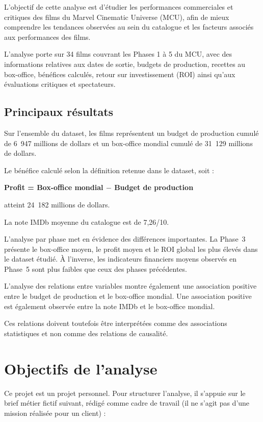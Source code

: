 \documentclass[a4paper,11pt]{article}
\begin{document}
L'objectif de cette analyse est d'étudier les performances commerciales et
critiques des films du Marvel Cinematic Universe (MCU), afin de mieux
comprendre les tendances observées au sein du catalogue et les facteurs
associés aux performances des films.

L'analyse porte sur 34 films couvrant les Phases 1 à 5 du MCU, avec des
informations relatives aux dates de sortie, budgets de production, recettes
au box-office, bénéfices calculés, retour sur investissement (ROI) ainsi
qu'aux évaluations critiques et spectateurs.

\subsection{Principaux résultats}

Sur l'ensemble du dataset, les films représentent un budget de production
cumulé de 6~947 millions de dollars et un box-office mondial cumulé de
31~129 millions de dollars.

Le bénéfice calculé selon la définition retenue dans le dataset, soit :
\begin{center}
\textbf{Profit = Box-office mondial $-$ Budget de production}
\end{center}
atteint 24~182 millions de dollars.

La note IMDb moyenne du catalogue est de 7,26/10.

L'analyse par phase met en évidence des différences importantes. La Phase~3
présente le box-office moyen, le profit moyen et le ROI global les plus
élevés dans le dataset étudié. À l'inverse, les indicateurs financiers moyens
observés en Phase~5 sont plus faibles que ceux des phases précédentes.

L'analyse des relations entre variables montre également une association
positive entre le budget de production et le box-office mondial. Une
association positive est également observée entre la note IMDb et le
box-office mondial.

Ces relations doivent toutefois être interprétées comme des associations
statistiques et non comme des relations de causalité.

\section{Objectifs de l'analyse}

Ce projet est un projet personnel. Pour structurer l'analyse, il s'appuie sur
le brief métier fictif suivant, rédigé comme cadre de travail (il ne s'agit
pas d'une mission réalisée pour un client) :
\end{document}

